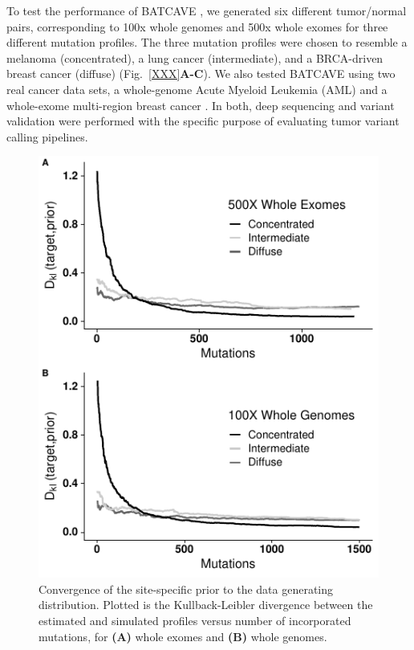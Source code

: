 \documentclass[a4,center,fleqn]{NAR}
\newcommand{\batcave}{BATCAVE }
\begin{document}
To test the performance of \batcave, we generated six different tumor/normal pairs, corresponding to 100x whole genomes and 500x whole exomes for three different mutation profiles.
The three mutation profiles were chosen to resemble a melanoma (concentrated), a lung cancer (intermediate), and a BRCA-driven breast cancer (diffuse) (Fig.~\ref{XXX}\textbf{A-C}).
We also tested \batcave using two real cancer data sets, a whole-genome Acute Myeloid Leukemia (AML) \cite{Griffiths2015} and a whole-exome multi-region breast cancer \cite{Shi2018}.
In both, deep sequencing and variant validation were performed with the specific purpose of evaluating tumor variant calling pipelines.

\begin{figure}
  \begin{center}
  \includegraphics{figures/kl_only.pdf}
  \end{center}
  \caption{Convergence of the site-specific prior to the data generating distribution. Plotted is the Kullback-Leibler divergence between the estimated and simulated profiles versus number of incorporated mutations, for \textbf{(A)} whole exomes and \textbf{(B)} whole genomes.
  }
\label{NAR-kl_fig}
\end{figure}
\end{document}
